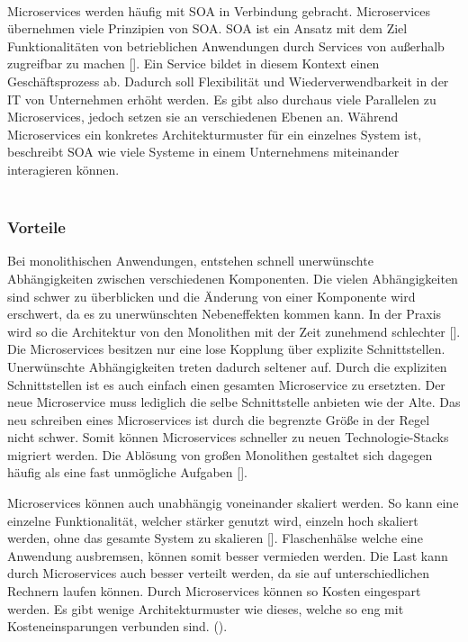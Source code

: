 \\
Microservices werden häufig mit \ac{SOA} in Verbindung gebracht. Microservices übernehmen viele Prinzipien von \ac{SOA}. \ac{SOA} ist ein Ansatz mit dem Ziel Funktionalitäten von betrieblichen Anwendungen durch Services von außerhalb zugreifbar zu machen [\cite[S. 2]{wolffMicroservices2018}]. Ein Service bildet in diesem Kontext einen Geschäftsprozess ab. Dadurch soll Flexibilität und Wiederverwendbarkeit in der IT von Unternehmen erhöht werden. Es gibt also durchaus viele Parallelen zu Microservices, jedoch setzen sie an verschiedenen Ebenen an. Während Microservices ein konkretes Architekturmuster für ein einzelnes System ist, beschreibt \ac{SOA} wie viele Systeme in einem Unternehmens miteinander interagieren können. \\
\\

\subsubsection{Vorteile}

Bei monolithischen Anwendungen, entstehen schnell unerwünschte Abhängigkeiten zwischen verschiedenen Komponenten. Die vielen Abhängigkeiten sind schwer zu überblicken und die Änderung von einer Komponente wird erschwert, da es zu unerwünschten Nebeneffekten kommen kann. In der Praxis wird so die Architektur von den Monolithen mit der Zeit zunehmend schlechter [\cite[S. 3]{wolffMicroservices2018}]. Die Microservices besitzen nur eine lose Kopplung über explizite Schnittstellen. Unerwünschte Abhängigkeiten treten dadurch seltener auf. Durch die expliziten Schnittstellen ist es auch einfach einen gesamten Microservice zu ersetzten. Der neue Microservice muss lediglich die selbe Schnittstelle anbieten wie der Alte. Das neu schreiben eines Microservices ist durch die begrenzte Größe in der Regel nicht schwer. Somit können Microservices schneller zu neuen Technologie-Stacks migriert werden. Die Ablösung von großen Monolithen gestaltet sich dagegen häufig als eine fast unmögliche Aufgaben [\cite[S. 29]{newmanMicroservices2015}]. 

Microservices können auch unabhängig voneinander skaliert werden. So kann eine einzelne Funktionalität, welcher stärker genutzt wird, einzeln hoch skaliert werden, ohne das gesamte System zu skalieren [\cite[S. 5]{wolffMicroservices2018}]. Flaschenhälse welche eine Anwendung ausbremsen, können somit besser vermieden werden. Die Last kann durch Microservices auch besser verteilt werden, da sie auf unterschiedlichen Rechnern laufen können. Durch Microservices können so Kosten eingespart werden. Es gibt wenige Architekturmuster wie dieses, welche so eng mit Kosteneinsparungen verbunden sind. (\cite[S. 27]{newmanMicroservices2015}).

